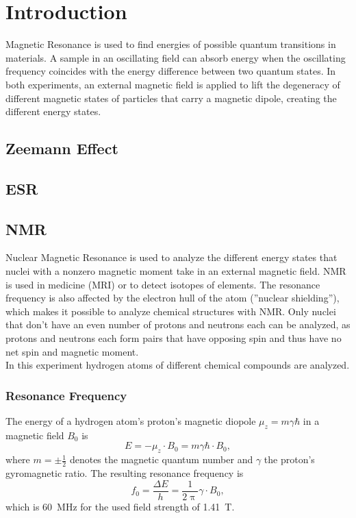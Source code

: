 \chapter{Introduction}
Magnetic Resonance is used to find energies of possible quantum transitions in materials.
A sample in an oscillating field can absorb energy when the oscillating frequency coincides with the energy difference between two quantum states. %
In both experiments, an external magnetic field is applied to lift the degeneracy of different magnetic states of particles that carry a magnetic dipole, creating the different energy states.

\section{Zeemann Effect}


\section{ESR}

\section{NMR}
Nuclear Magnetic Resonance is used to analyze the different energy states that nuclei with a nonzero magnetic moment take in an external magnetic field.
NMR is used in medicine (MRI) or to detect isotopes of elements.
The resonance frequency is also affected by the electron hull of the atom (''nuclear shielding''), which makes it possible to analyze chemical structures with NMR.
Only nuclei that don't have an even number of protons and neutrons each can be analyzed, as protons and neutrons each form pairs that have opposing spin and thus have no net spin and magnetic moment.\\
In this experiment hydrogen atoms of different chemical compounds are analyzed.

\subsection{Resonance Frequency}

The energy of a hydrogen atom's proton's magnetic diopole $\mu_z = m \gamma \hbar$ in a magnetic field $B_0$ is
\begin{equation*}
	E = - \mu_z \cdot B_0 = m \gamma \hbar \cdot B_0,
\end{equation*}
where $m = \pm \tfrac{1}{2}$ denotes the magnetic quantum number and $\gamma$ the proton's gyromagnetic ratio.
The resulting resonance frequency is
\begin{equation*}
	f_0 = \frac{\Delta E}{h} = \frac{1}{2 \uppi} \gamma \cdot B_0,
\end{equation*}
which is \SI{60}{\mega\hertz} for the used field strength of \SI{1.41}{\tesla}.

